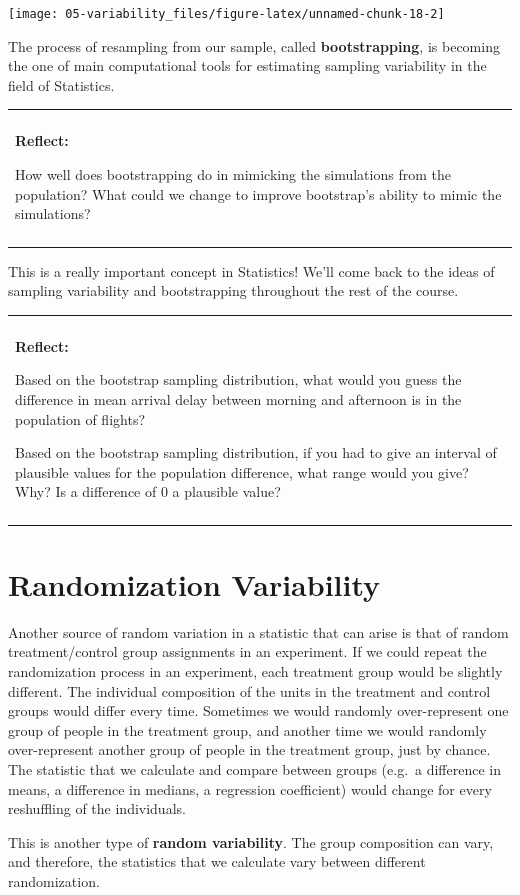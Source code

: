 \documentclass[
]{book}
\newenvironment{reflect}
{
    \begin{center}
    
    \begin{tabular}{|p{0.8\textwidth}|}
    \rowcolor{LightBlue}
    \hline\\
    \rowcolor{LightBlue}
    \textbf{Reflect:}
}
{
    \\\rowcolor{LightBlue}
    \\\hline
    \end{tabular} 
    \end{center}
}
\begin{document}
\begin{center}\texttt{[image: 05-variability\_files/figure-latex/unnamed-chunk-18-2]} \end{center}

The process of resampling from our sample, called \textbf{bootstrapping}, is becoming the one of main computational tools for estimating sampling variability in the field of Statistics.

\begin{reflect}
How well does bootstrapping do in mimicking the simulations from the
population? What could we change to improve bootstrap's ability to mimic
the simulations?
\end{reflect}

This is a really important concept in Statistics! We'll come back to the ideas of sampling variability and bootstrapping throughout the rest of the course.

\begin{reflect}
Based on the bootstrap sampling distribution, what would you guess the
difference in mean arrival delay between morning and afternoon is in the
population of flights?

Based on the bootstrap sampling distribution, if you had to give an
interval of plausible values for the population difference, what range
would you give? Why? Is a difference of 0 a plausible value?
\end{reflect}

\section{Randomization Variability}\label{randomization-variability}

Another source of random variation in a statistic that can arise is that of random treatment/control group assignments in an experiment. If we could repeat the randomization process in an experiment, each treatment group would be slightly different. The individual composition of the units in the treatment and control groups would differ every time. Sometimes we would randomly over-represent one group of people in the treatment group, and another time we would randomly over-represent another group of people in the treatment group, just by chance. The statistic that we calculate and compare between groups (e.g.~a difference in means, a difference in medians, a regression coefficient) would change for every reshuffling of the individuals.

This is another type of \textbf{random variability}. The group composition can vary, and therefore, the statistics that we calculate vary between different randomization.
\end{document}
